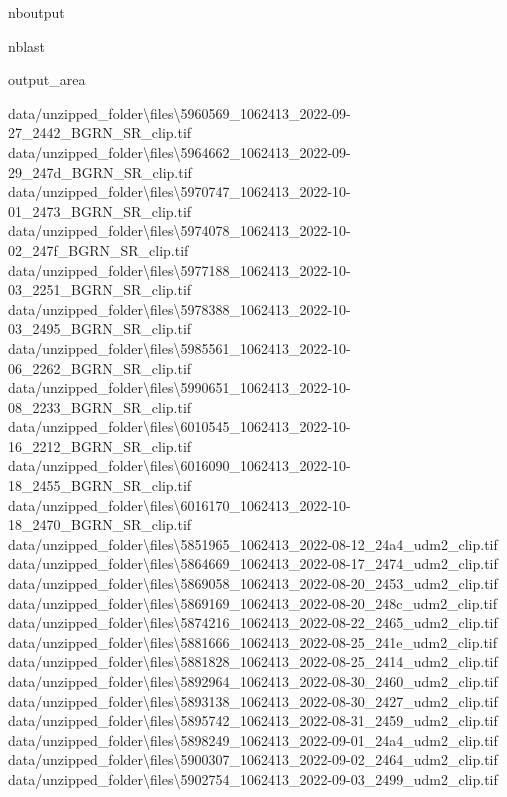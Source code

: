 \documentclass[letterpaper,10pt]{sphinxmanual}
\begin{document}
\begin{sphinxuseclass}{nboutput}
\begin{sphinxuseclass}{nblast}
{\begin{sphinxuseclass}{output_area}
\begin{sphinxuseclass}{}
\begin{sphinxVerbatim}[commandchars=\\\{\}]
data/unzipped\_folder\textbackslash{}files\textbackslash{}5960569\_1062413\_2022-09-27\_2442\_BGRN\_SR\_clip.tif
data/unzipped\_folder\textbackslash{}files\textbackslash{}5964662\_1062413\_2022-09-29\_247d\_BGRN\_SR\_clip.tif
data/unzipped\_folder\textbackslash{}files\textbackslash{}5970747\_1062413\_2022-10-01\_2473\_BGRN\_SR\_clip.tif
data/unzipped\_folder\textbackslash{}files\textbackslash{}5974078\_1062413\_2022-10-02\_247f\_BGRN\_SR\_clip.tif
data/unzipped\_folder\textbackslash{}files\textbackslash{}5977188\_1062413\_2022-10-03\_2251\_BGRN\_SR\_clip.tif
data/unzipped\_folder\textbackslash{}files\textbackslash{}5978388\_1062413\_2022-10-03\_2495\_BGRN\_SR\_clip.tif
data/unzipped\_folder\textbackslash{}files\textbackslash{}5985561\_1062413\_2022-10-06\_2262\_BGRN\_SR\_clip.tif
data/unzipped\_folder\textbackslash{}files\textbackslash{}5990651\_1062413\_2022-10-08\_2233\_BGRN\_SR\_clip.tif
data/unzipped\_folder\textbackslash{}files\textbackslash{}6010545\_1062413\_2022-10-16\_2212\_BGRN\_SR\_clip.tif
data/unzipped\_folder\textbackslash{}files\textbackslash{}6016090\_1062413\_2022-10-18\_2455\_BGRN\_SR\_clip.tif
data/unzipped\_folder\textbackslash{}files\textbackslash{}6016170\_1062413\_2022-10-18\_2470\_BGRN\_SR\_clip.tif
data/unzipped\_folder\textbackslash{}files\textbackslash{}5851965\_1062413\_2022-08-12\_24a4\_udm2\_clip.tif
data/unzipped\_folder\textbackslash{}files\textbackslash{}5864669\_1062413\_2022-08-17\_2474\_udm2\_clip.tif
data/unzipped\_folder\textbackslash{}files\textbackslash{}5869058\_1062413\_2022-08-20\_2453\_udm2\_clip.tif
data/unzipped\_folder\textbackslash{}files\textbackslash{}5869169\_1062413\_2022-08-20\_248c\_udm2\_clip.tif
data/unzipped\_folder\textbackslash{}files\textbackslash{}5874216\_1062413\_2022-08-22\_2465\_udm2\_clip.tif
data/unzipped\_folder\textbackslash{}files\textbackslash{}5881666\_1062413\_2022-08-25\_241e\_udm2\_clip.tif
data/unzipped\_folder\textbackslash{}files\textbackslash{}5881828\_1062413\_2022-08-25\_2414\_udm2\_clip.tif
data/unzipped\_folder\textbackslash{}files\textbackslash{}5892964\_1062413\_2022-08-30\_2460\_udm2\_clip.tif
data/unzipped\_folder\textbackslash{}files\textbackslash{}5893138\_1062413\_2022-08-30\_2427\_udm2\_clip.tif
data/unzipped\_folder\textbackslash{}files\textbackslash{}5895742\_1062413\_2022-08-31\_2459\_udm2\_clip.tif
data/unzipped\_folder\textbackslash{}files\textbackslash{}5898249\_1062413\_2022-09-01\_24a4\_udm2\_clip.tif
data/unzipped\_folder\textbackslash{}files\textbackslash{}5900307\_1062413\_2022-09-02\_2464\_udm2\_clip.tif
data/unzipped\_folder\textbackslash{}files\textbackslash{}5902754\_1062413\_2022-09-03\_2499\_udm2\_clip.tif

\end{sphinxVerbatim}
\end{sphinxuseclass}
\end{sphinxuseclass}}
\end{sphinxuseclass}
\end{sphinxuseclass}
\end{document}
